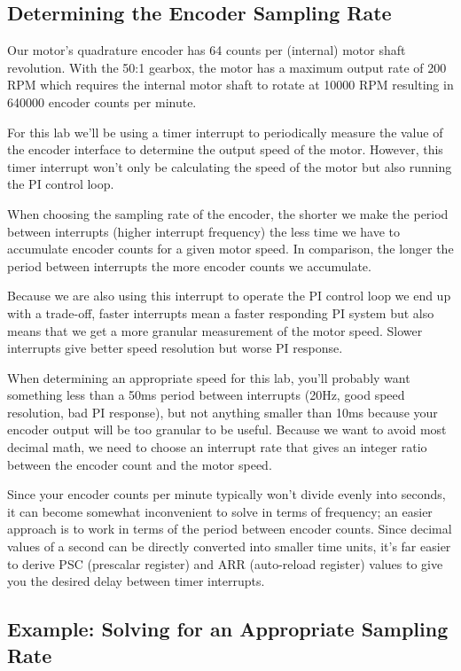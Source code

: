\documentclass[openany,11pt,fleqn]{book} %
\begin{document}
\subsection{Determining the Encoder Sampling Rate} \label{encoder_example}

Our motor's quadrature encoder has 64 counts per (internal) motor shaft revolution. With the 50:1 gearbox, the motor has a maximum output rate of 200 RPM which requires the internal motor shaft to rotate at 10000 RPM resulting in 640000 encoder counts per minute.

For this lab we'll be using a timer interrupt to periodically measure the value of the encoder interface to determine the output speed of the motor. However, this timer interrupt won't only be calculating the speed of the motor but also running the PI control loop.

When choosing the sampling rate of the encoder, the shorter we make the period between interrupts (higher interrupt frequency) the less time we have to accumulate encoder counts for a given motor speed. In comparison, the longer the period between interrupts the more encoder counts we accumulate. 

Because we are also using this interrupt to operate the PI control loop we end up with a trade-off, faster interrupts mean a faster responding PI system but also means that we get a more granular measurement of the motor speed. Slower interrupts give better speed resolution but worse PI response.

When determining an appropriate speed for this lab, you'll probably want something less than a 50ms period between interrupts (20Hz, good speed resolution, bad PI response), but not anything smaller than 10ms because your encoder output will be too granular to be useful. Because we want to avoid most decimal math, we need to choose an interrupt rate that gives an integer ratio between the encoder count and the motor speed.

Since your encoder counts per minute typically won't divide evenly into seconds, it can become somewhat inconvenient to solve in terms of frequency; an easier approach is to work in terms of the period between encoder counts. Since decimal values of a second can be directly converted into smaller time units, it's far easier to derive PSC (prescalar register) and ARR (auto-reload register) values to give you the desired delay between timer interrupts.


\subsection{Example: Solving for an Appropriate Sampling Rate}
\end{document}
